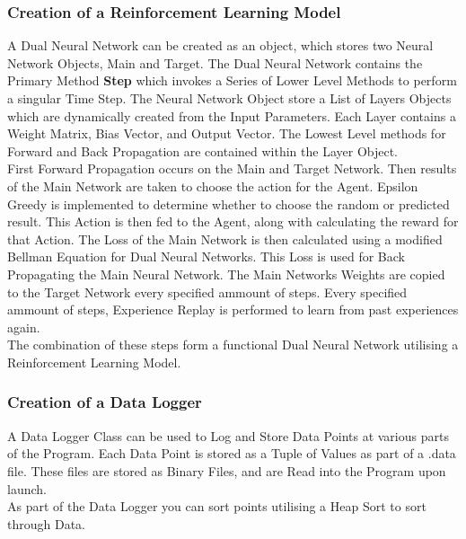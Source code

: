 \begin{flushleft}
        \subsubsection{Creation of a Reinforcement Learning Model}
            \vspace{0.2cm}
            A Dual Neural Network can be created as an object, which stores two Neural Network Objects, Main and Target. The Dual Neural Network
            contains the Primary Method \textbf{Step} which invokes a Series of Lower Level Methods to perform a singular Time Step. The Neural 
            Network Object store a List of Layers Objects which are dynamically created from the Input Parameters. Each Layer contains a Weight 
            Matrix, Bias Vector, and Output Vector. The Lowest Level methods for Forward and Back Propagation are contained within the Layer Object. \\
            \vspace{0.2cm}
            First Forward Propagation occurs on the Main and Target Network. Then results of the Main Network are taken to choose the action for the Agent. 
            Epsilon Greedy is implemented to determine whether to choose the random or predicted result. This Action is then fed to the Agent, along with 
            calculating the reward for that Action. The Loss of the Main Network is then calculated using a modified Bellman Equation for Dual Neural 
            Networks. This Loss is used for Back Propagating the Main Neural Network. The Main Networks Weights are copied to the Target Network
            every specified ammount of steps. Every specified ammount of steps, Experience Replay is performed to learn from past experiences again. \\
            \vspace{0.2cm}
            The combination of these steps form a functional Dual Neural Network utilising a Reinforcement Learning Model. \\

            \vspace{0.5cm}   
        \subsubsection{Creation of a Data Logger}
            \vspace{0.2cm}
            A Data Logger Class can be used to Log and Store Data Points at various parts of the Program. Each Data Point is stored as a Tuple of Values
            as part of a .data file. These files are stored as Binary Files, and are Read into the Program upon launch. \\
            \vspace{0.2cm}
            As part of the Data Logger you can sort points utilising a Heap Sort to sort through Data. \\


\end{flushleft}
